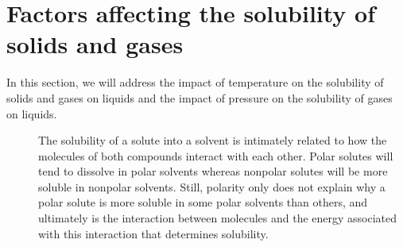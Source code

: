 \documentclass[main.tex]{subfiles}
\begin{document}
\section{Factors affecting the solubility of solids and gases}
In this section, we will address the impact of temperature on the solubility of solids and gases on liquids and the impact of pressure on the solubility of gases on liquids.
\sloppy 
\begin{description}
\item[] 
The solubility of a solute into a solvent is intimately related to how the molecules of both compounds interact with each other. Polar solutes will tend to dissolve in polar solvents whereas nonpolar solutes will be more soluble in nonpolar solvents. Still, polarity only does not explain why a polar solute is more soluble in some polar solvents than others, and ultimately is the interaction between molecules and the energy associated with this interaction that determines solubility.


\end{description}
\end{document}
